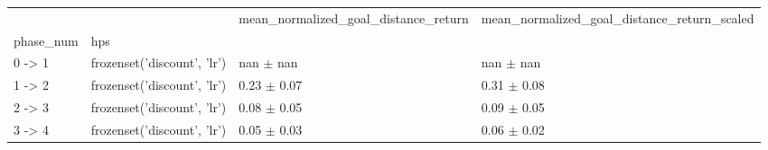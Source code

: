 \begin{tabular}{llll}
\toprule
 &  & mean_normalized_goal_distance_return & mean_normalized_goal_distance_return_scaled \\
phase_num & hps &  &  \\
\midrule
0 -> 1 & frozenset({'discount', 'lr'}) & nan $\pm$ nan & nan $\pm$ nan \\
\cline{1-4}
1 -> 2 & frozenset({'discount', 'lr'}) & 0.23 $\pm$ 0.07 & 0.31 $\pm$ 0.08 \\
\cline{1-4}
2 -> 3 & frozenset({'discount', 'lr'}) & 0.08 $\pm$ 0.05 & 0.09 $\pm$ 0.05 \\
\cline{1-4}
3 -> 4 & frozenset({'discount', 'lr'}) & 0.05 $\pm$ 0.03 & 0.06 $\pm$ 0.02 \\
\cline{1-4}
\bottomrule
\end{tabular}
